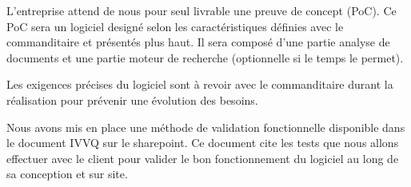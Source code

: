 
L'entreprise attend de nous pour seul livrable une preuve de concept (PoC).
Ce PoC sera un logiciel designé selon les caractéristiques définies avec le commanditaire et présentés plus haut.
Il sera composé d'une partie analyse de documents et une partie moteur de recherche (optionnelle si le temps le permet).

Les exigences précises du logiciel sont à revoir avec le commanditaire durant la réalisation pour prévenir une évolution des besoins.

Nous avons mis en place une méthode de validation fonctionnelle disponible dans le document IVVQ sur le sharepoint.
Ce document cite les tests que nous allons effectuer avec le client pour valider le bon fonctionnement du logiciel au long de sa conception et sur site.

